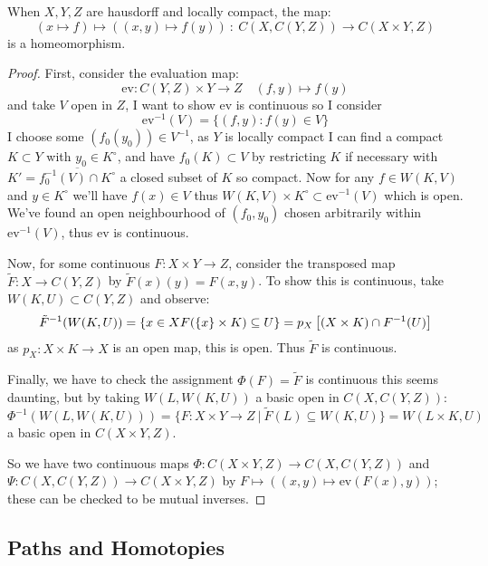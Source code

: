 \documentclass[a4paper]{article}
\begin{document}
\begin{proposition}
    When $X,Y,Z$ are hausdorff and locally compact, the map: \[
        (x \mapsto f) \mapsto ( (x,y) \mapsto f(y)) \ : \ C(X,C(Y,Z)) \rightarrow C(X\times Y, Z)
    \] is a homeomorphism.\begin{proof}
         First, consider the evaluation map:\[
         \text{ev}:C(Y,Z)\times Y \rightarrow Z \quad (f,y)\mapsto f(y)
         \] and take $V$ open in $Z$, I want to show $\text{ev}$ is continuous so I consider \[
         \text{ev}^{-1}(V) = \{(f,y) : f(y)\in V\}
         \] I choose some $(f_0(y_0))\in V^{-1}$, as $Y$ is locally compact I can find a compact $K\subset Y$ with $y_0\in K^\circ$, and have $f_0(K)\subset V$ by restricting $K$ if necessary with $K' = \overline{f_0^{-1}(V)\cap K^\circ}$ a closed subset of $K$ so compact. Now for any $f\in W(K,V)$ and $y\in K^\circ$ we'll have $f(x)\in V$ thus $W(K,V)\times K^\circ\subset \text{ev}^{-1}(V)$ which is open. We've found an open neighbourhood of $(f_0,y_0)$ chosen arbitrarily within $\text{ev}^{-1}(V)$, thus $\text{ev}$ is continuous.

        Now, for some continuous $F:X\times Y \rightarrow Z$, consider the transposed map $\tilde{F}:X\rightarrow C(Y,Z)$ by $\tilde{F}(x)(y) = F(x,y)$. To show this is continuous, take $W(K,U)\subset C(Y,Z)$ and observe: \[
        \tilde{F}^{-1}(W(K,U)) = \{x \in X F(\{x\}\times K)\subseteq U\} = p_X\left[ (X\times K) \cap F^{-1}(U) \right]
        \] as $p_X: X\times K \rightarrow X$ is an open map, this is open. Thus $\tilde{F}$ is continuous.
        
        Finally, we have to check the assignment $\Phi(F) = \tilde{F}$ is continuous this seems daunting, but by taking $W(L,W(K,U))$ a basic open in $C(X,C(Y,Z))$:\[
        \Phi^{-1}(W(L,W(K,U))) = \{F:X\times Y\rightarrow Z \ | \ \tilde{F}(L)\subseteq W(K,U)\} = W(L\times K, U)
        \] a basic open in $C(X\times Y, Z)$.

        So we have two continuous maps $\Phi:C(X\times Y, Z) \rightarrow C(X,C(Y,Z))$ and $\Psi:C(X,C(Y,Z))\rightarrow C(X\times Y, Z)$ by $F\mapsto ((x,y) \mapsto \text{ev}(F(x),y))$; these can be checked to be mutual inverses.
    \end{proof}
\end{proposition}

\subsection{Paths and Homotopies}
\end{document}
